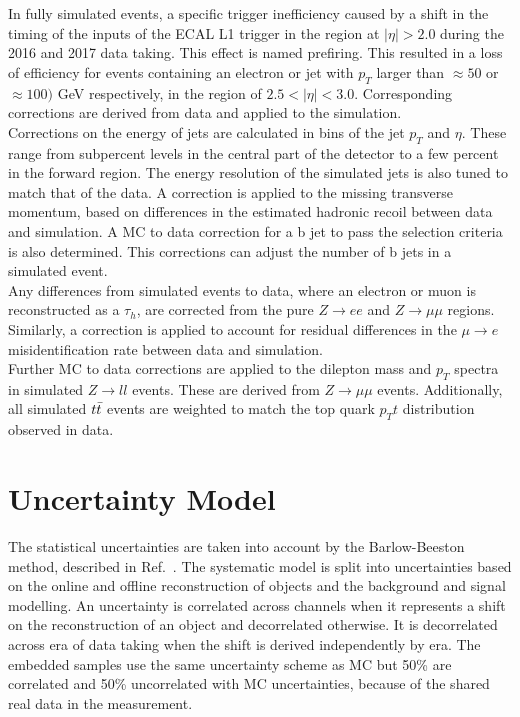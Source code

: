 In fully simulated events, a specific trigger inefficiency caused by a shift in the timing of the inputs of the ECAL L1 trigger in the region at $|\eta|>2.0$ during the 2016 and 2017 data taking.
This effect is named prefiring.
This resulted in a loss of efficiency for events containing an electron or jet with $p_T$ larger than ${\approx}50$ or ${\approx}100)$ GeV respectively, in the region of $2.5<|\eta|<3.0$. 
Corresponding corrections are derived from data and applied to the simulation. \\

Corrections on the energy of jets are calculated in bins of the jet $p_T$ and $\eta$.
These range from subpercent levels in the central part of the detector to a few percent in the forward region. 
The energy resolution of the simulated jets is also tuned to match that of the data. 
A correction is applied to the missing transverse momentum, based on differences in the estimated hadronic recoil between data and simulation. 
A MC to data correction for a b jet to pass the selection criteria is also determined. 
This corrections can adjust the number of b jets in a simulated event. \\

Any differences from simulated events to data, where an electron or muon is reconstructed as a $\tau_h$, are corrected from the pure $Z\rightarrow ee$ and $Z\rightarrow\mu\mu$ regions. 
Similarly, a correction is applied to account for residual differences in the $\mu\rightarrow e$ misidentification rate between data and simulation. \\

Further MC to data corrections are applied to the dilepton mass and $p_{T}$ spectra in simulated $Z\rightarrow ll$ events. 
These are derived from $Z\rightarrow\mu\mu$ events.
Additionally, all simulated $t\bar{t}$ events are weighted to match the top quark $p_{T}t$ distribution observed in data.

\section{Uncertainty Model}
\label{sec:uncerts}

The statistical uncertainties are taken into account by the Barlow-Beeston method, described in Ref.~\cite{Barlow:1993dm,Conway:2011in}.
The systematic model is split into uncertainties based on the online and offline reconstruction of objects and the background and signal modelling.
An uncertainty is correlated across channels when it represents a shift on the reconstruction of an object and decorrelated otherwise.
It is decorrelated across era of data taking when the shift is derived independently by era.
The embedded samples use the same uncertainty scheme as MC but 50\% are correlated and 50\% uncorrelated with MC uncertainties, because of the shared real data in the measurement.

